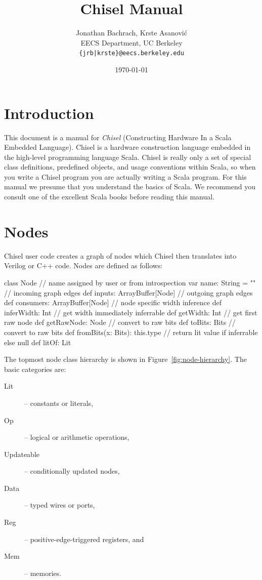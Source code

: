 \documentclass[10pt,twocolumn]{article}
\title{Chisel Manual}
\author{Jonathan Bachrach, Krste Asanovi\'{c} \\
EECS Department, UC Berkeley\\
{\tt  \{jrb|krste\}@eecs.berkeley.edu}
}
\date{\today}
\begin{document}
\maketitle{}




\section{Introduction}

This document is a manual for {\em Chisel} (Constructing
Hardware In a Scala Embedded Language).  Chisel is a hardware
construction language embedded in the high-level programming language
Scala.  Chisel is really only a set of special class
definitions, predefined objects, and usage conventions within Scala,
so when you write a Chisel program you are actually writing a Scala
program.  For this manual we presume that you
understand the basics of Scala.  
We recommend you consult one of the excellent
Scala books before reading this manual.

\section{Nodes}

Chisel user code creates a graph of nodes which Chisel then translates
into Verilog or C++ code.  Nodes are defined as follows:

\begin{scala}
class Node {
  // name assigned by user or from introspection
  var name: String = ""
  // incoming graph edges
  def inputs: ArrayBuffer[Node]
  // outgoing graph edges
  def consumers: ArrayBuffer[Node]
  // node specific width inference
  def inferWidth: Int
  // get width immediately inferrable
  def getWidth: Int
  // get first raw node
  def getRawNode: Node
  // convert to raw bits 
  def toBits: Bits
  // convert to raw bits 
  def fromBits(x: Bits): this.type
  // return lit value if inferrable else null
  def litOf: Lit
}
\end{scala}


The topmost node class hierarchy is shown in
Figure~\ref{fig:node-hierarchy}.  The basic categories are:

\begin{description}
\item[Lit] -- constants or literals,
\item[Op] -- logical or arithmetic operations,
\item[Updateable] -- conditionally updated nodes,
\item[Data] -- typed wires or ports,
\item[Reg] -- positive-edge-triggered registers, and
\item[Mem] -- memories.
\end{description}
\end{document}

